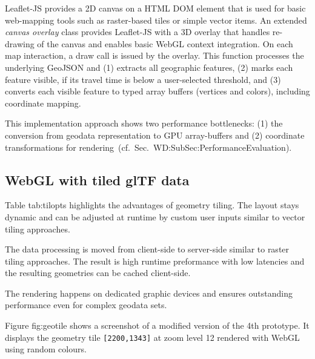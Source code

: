       Leaflet-JS provides a 2D canvas on a HTML DOM element that is used for basic
      web-mapping tools such as raster-based tiles or simple vector items. An extended
      \textsl{canvas overlay} class provides Leaflet-JS with a 3D overlay that handles
      re-drawing of the canvas and enables basic WebGL context integration. On each map
      interaction, a draw call is issued by the overlay. This function processes the
      underlying GeoJSON and (1) extracts all geographic features, (2) marks each feature
      visible, if its travel time is below a user-selected threshold, and (3) converts
      each visible feature to typed array buffers (vertices and colors), including coordinate mapping.\par
      This implementation approach shows two performance bottlenecks: (1) the conversion
      from geodata representation to GPU array-buffers and (2) coordinate transformations
      for rendering~(cf.~Sec.~{WD:SubSec:PerformanceEvaluation}). \par
    \subsection{WebGL with tiled glTF data}
      \label{sec:imple:applc:tgltf}
      Table {tab:tilopts} highlights the advantages of geometry tiling. The layout stays dynamic and can be adjusted at runtime by custom user inputs similar to vector tiling approaches.\par
      The data processing is moved from client-side to server-side similar to raster tiling approaches. The result is high runtime preformance with low latencies and the resulting geometries can be cached client-side.\par
      The rendering happens on dedicated graphic devices and ensures outstanding performance even for complex geodata sets.

      Figure {fig:geotile} shows a screenshot of a modified version of the 4th prototype. It displays the geometry tile \texttt{[2200,1343]} at zoom level 12 rendered with WebGL using random colours.

